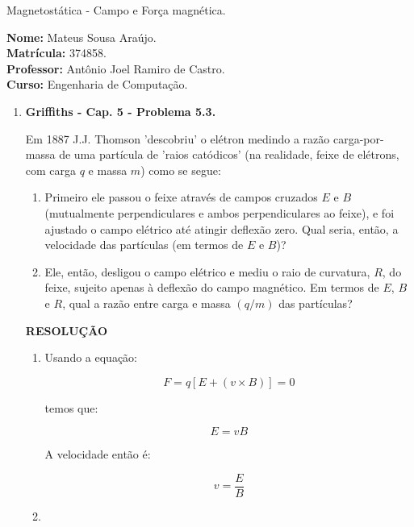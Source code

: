 \documentclass[11pt,a4paper]{article}
\begin{document}
	\begin{center}
		\Large Magnetostática - Campo e Força magnética. 
	\end{center}

\begin{flushleft}
\textbf{Nome:} Mateus Sousa Araújo. \\
\textbf{Matrícula:} 374858. \\
\textbf{Professor:} Antônio Joel Ramiro de Castro. \\
\textbf{Curso:} Engenharia de Computação. \\
\end{flushleft}

\begin{enumerate}

\item \textbf{Griffiths - Cap. 5 - Problema 5.3.}

Em 1887 J.J. Thomson 'descobriu' o elétron medindo a razão carga-por-massa de uma partícula de 'raios catódicos' (na realidade, feixe de elétrons, com carga $q$ e massa $m$) como se segue:

\begin{enumerate}
\item Primeiro ele passou o feixe através de campos cruzados $E$ e $B$ (mutualmente perpendiculares e ambos perpendiculares ao feixe), e foi ajustado o campo elétrico até atingir deflexão zero. Qual seria, então, a velocidade das partículas (em termos de $E$ e $B$)?

\item Ele, então, desligou o campo elétrico e mediu o raio de curvatura, $R$, do feixe, sujeito apenas à deflexão do campo magnético. Em termos de $E$, $B$ e $R$, qual a razão entre carga e massa $(q/m)$ das partículas?
\end{enumerate}


\textbf{RESOLUÇÃO}

\begin{enumerate}

\item 

Usando a equação:

$$F = q[E + (v \times B)] = 0$$

temos que:

$$E = vB$$

A velocidade então é:

$$v = \displaystyle\dfrac{E}{B}$$

\item


\end{enumerate}
\end{enumerate}
\end{document}
